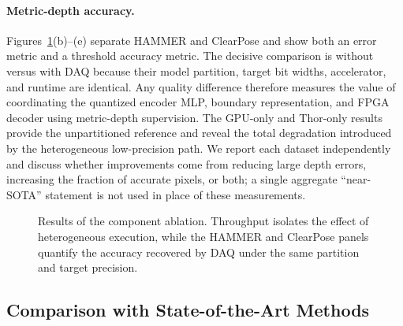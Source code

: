 \paragraph{Metric-depth accuracy.}
Figures~\ref{fig:ablation-results}(b)--(e) separate HAMMER and ClearPose and
show both an error metric and a threshold accuracy metric.  The decisive
comparison is \system{} without versus with DAQ because their model partition,
target bit widths, accelerator, and runtime are identical.  Any quality
difference therefore measures the value of coordinating the quantized encoder
MLP, boundary representation, and FPGA decoder using metric-depth supervision.
The GPU-only and Thor-only results provide the unpartitioned reference and
reveal the total degradation introduced by the heterogeneous low-precision
path.  We report each dataset independently and discuss whether improvements
come from reducing large depth errors, increasing the fraction of accurate
pixels, or both; a single aggregate ``near-SOTA'' statement is not used in
place of these measurements.

\begin{figure}[t]
  \centering
  \caption{Results of the component ablation.  Throughput isolates the effect
  of heterogeneous execution, while the HAMMER and ClearPose panels quantify
  the accuracy recovered by DAQ under the same partition and target precision.}
  \label{fig:ablation-results}
\end{figure}

\subsection{Comparison with State-of-the-Art Methods}

